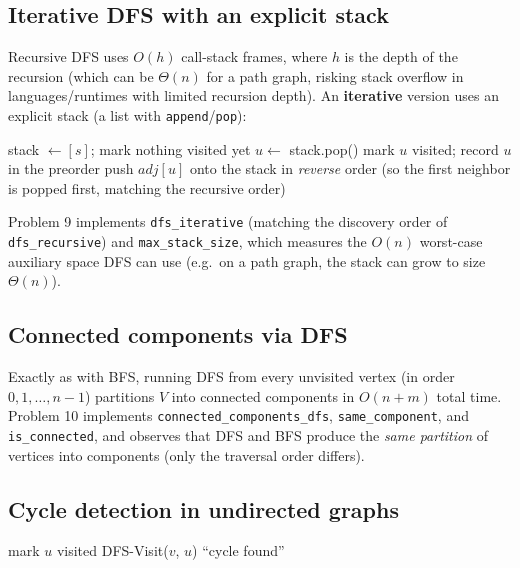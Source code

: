 \documentclass[11pt]{article}
\begin{document}
\subsection{Iterative DFS with an explicit stack}

Recursive DFS uses $O(h)$ call-stack frames, where $h$ is the depth of the recursion
(which can be $\Theta(n)$ for a path graph, risking stack overflow in languages/runtimes
with limited recursion depth). An \textbf{iterative} version uses an explicit stack
(a list with \texttt{append}/\texttt{pop}):

\begin{algorithm}[h]
\caption{Iterative DFS$(adj, s)$}
\begin{algorithmic}[1]
\State stack $\gets [s]$; mark nothing visited yet
    \State $u \gets$ stack.pop()
        \State mark $u$ visited; record $u$ in the preorder
        \State push $adj[u]$ onto the stack in \emph{reverse} order (so the first
        neighbor is popped first, matching the recursive order)
    \EndIf
\EndWhile
\end{algorithmic}
\end{algorithm}

Problem 9 implements \texttt{dfs\_iterative} (matching the discovery order of
\texttt{dfs\_recursive}) and \texttt{max\_stack\_size}, which measures the $O(n)$
worst-case auxiliary space DFS can use (e.g.\ on a path graph, the stack can grow to size
$\Theta(n)$).

\subsection{Connected components via DFS}

Exactly as with BFS, running DFS from every unvisited vertex (in order $0, 1, \dots,
n-1$) partitions $V$ into connected components in $O(n+m)$ total time. Problem 10
implements \texttt{connected\_components\_dfs}, \texttt{same\_component}, and
\texttt{is\_connected}, and observes that DFS and BFS produce the \emph{same partition}
of vertices into components (only the traversal order differs).

\subsection{Cycle detection in undirected graphs}

\begin{algorithm}[h]
\caption{Cycle detection (undirected) via DFS}
\begin{algorithmic}[1]
    \State mark $u$ visited
            \State DFS-Visit($v$, $u$)
            \State \Return ``cycle found'' 
        \EndIf
    \EndFor
\EndFunction
\end{algorithmic}
\end{algorithm}
\end{document}
